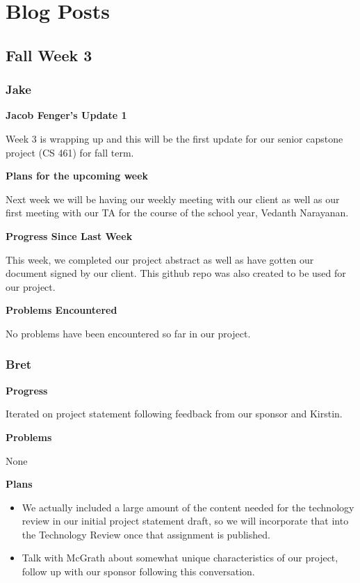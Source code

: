 \documentclass[10pt, onecolumn, draftclsnofoot, letterpaper, compsoc]{IEEEtran}
\begin{document}
\section{Blog Posts}

\subsection{Fall Week 3}

    \subsubsection{Jake}

    \noindent \textbf{Jacob Fenger's Update 1}

    Week 3 is wrapping up and this will be the first update for our senior capstone
    project (CS 461) for fall term.

    \noindent \textbf{Plans for the upcoming week}

    Next week we will be having our weekly meeting with our client as well as our
    first meeting with our TA for the course of the school year, Vedanth Narayanan.

    \noindent \textbf{Progress Since Last Week}

    This week, we completed our project abstract as well as have gotten our
    document signed by our client. This github repo was also created to be used
    for our project.

    \noindent \textbf{Problems Encountered}

    No problems have been encountered so far in our project.

    \subsubsection{Bret}

    \textbf{Progress}

    Iterated on project statement following feedback from our sponsor and Kirstin.

    \noindent \textbf{Problems}

    None

    \noindent \textbf{Plans}
    \begin{itemize}
        \item We actually included a large amount of the content needed for the technology
        review in our initial project statement draft, so we will incorporate that
        into the Technology Review once that assignment is published.
        \item Talk with McGrath about somewhat unique characteristics of our project,
        follow up with our sponsor following this conversation.

    \end{itemize}
\end{document}

